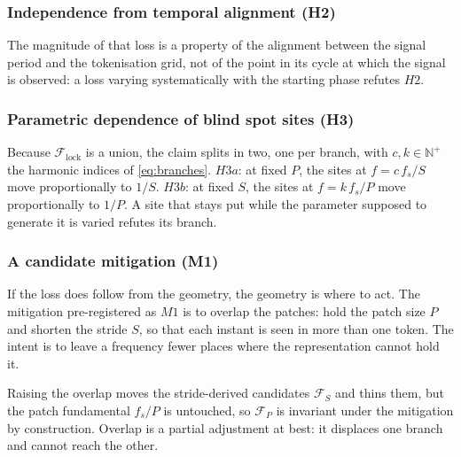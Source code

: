 \subsubsection*{Independence from temporal alignment (H2)}
The magnitude of that loss is a property of the alignment between the signal period and the tokenisation grid, not of the point in its cycle at which the signal is observed: a loss varying systematically with the starting phase refutes $H2$.

\subsubsection*{Parametric dependence of blind spot sites (H3)}
Because $\mathcal F_{\mathrm{lock}}$ is a union, the claim splits in two, one per branch, with $c,k\in\mathbb{N}^{+}$ the harmonic indices of \autoref{eq:branches}. $H3a$: at fixed $P$, the sites at $f=c\,f_s/S$ move proportionally to $1/S$. $H3b$: at fixed $S$, the sites at $f=k\,f_s/P$ move proportionally to $1/P$. A site that stays put while the parameter supposed to generate it is varied refutes its branch.

\subsubsection*{A candidate mitigation (M1)}
If the loss does follow from the geometry, the geometry is where to act. The mitigation pre-registered as $M1$ is to overlap the patches: hold the patch size $P$ and shorten the stride $S$, so that each instant is seen in more than one token. The intent is to leave a frequency fewer places where the representation cannot hold it.

Raising the overlap moves the stride-derived candidates $\mathcal{F}_{S}$ and thins them, but the patch fundamental $f_s/P$ is untouched, so $\mathcal{F}_{P}$ is invariant under the mitigation by construction. Overlap is a partial adjustment at best: it displaces one branch and cannot reach the other.

